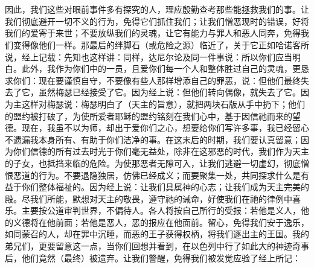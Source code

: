 \section{}

因此，我们这些对眼前事件多有探究的人，理应殷勤查考那些能拯救我们的事。让我们彻底避开一切不义的行为，免得它们抓住我们；让我们憎恶现时的错误，好将我们的爱寄于来世；不要放纵我们的灵魂，让它有能力与罪人和恶人同奔，免得我们变得像他们一样。那最后的绊脚石（或危险之源）临近了，关于它正如哈诺客所说，经上记载：先知也这样讲：同样，达尼尔论及同一件事说：所以你们应当明白。此外，我作为你们中的一员，且爱你们每一个人和整体胜过自己的灵魂，更恳求你们：现在要谨慎自守，不要像有些人那样增添自己的罪恶，说：但他们最终失去了它，虽然梅瑟已经接受了它。因为经上说：但他们转向偶像，就失去了它。因为主这样对梅瑟说：梅瑟明白了（天主的旨意），就把两块石版从手中扔下；他们的盟约被打破了，为使所爱者耶稣的盟约铭刻在我们心中，基于因信祂而来的望德。现在，我虽不以为师，却出于爱你们之心，想要给你们写许多事，我已经留心不遗漏我本身所有、有助于你们洁净的事。在这末后的时期，我们要认真留意；因为你们信德的所有过去时光于你们毫无益处，除非在这邪恶的时代，我们作为天主的子女，也抵挡来临的危险。为使那恶者无隙可入，让我们逃避一切虚幻，彻底憎恨恶道的行为。不要退隐独居，仿佛已经成义；而要聚集一处，共同探求什么是有益于你们整体福祉的。因为经上说：让我们具属神的心志；让我们成为天主完美的殿。尽我们所能，默想对天主的敬畏，遵守祂的诫命，好使我们在祂的律例中喜乐。主要按公道审判世界，不偏待人。各人将按自己所行的受报：若他是义人，他的义德将在他前面；若他是恶人，恶的报应在他面前。留心，免得我们安于逸乐，如同蒙召的人，却在罪中沉睡，而恶的王子获得权柄，将我们逐出主的王国。我的弟兄们，更要留意这一点，当你们回想并看到，在以色列中行了如此大的神迹奇事后，他们竟然（最终）被遗弃。让我们警醒，免得我们被发觉应验了经上所记：\par


